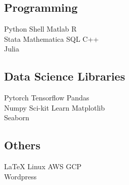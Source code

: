 \documentclass[letterpaper]{deedy-resume} %
\begin{document}
\begin{minipage}[t]{0.33\textwidth}
\subsection{Programming}

Python \textbullet{} Shell \textbullet{} Matlab \textbullet{} R \\
Stata \textbullet{} Mathematica \textbullet{} SQL \textbullet{} C++ \\ Julia \\
\subsection{Data Science Libraries}
Pytorch \textbullet{} Tensorflow \textbullet{} Pandas \\ Numpy \textbullet{} Sci-kit Learn \textbullet{} Matplotlib \\ Seaborn \\
\subsection{Others}
\LaTeX \textbullet{} Linux \textbullet{} AWS \textbullet{} GCP \\ Wordpress

\sectionspace %


\end{minipage} %
\hfill
%
%
\end{document}
